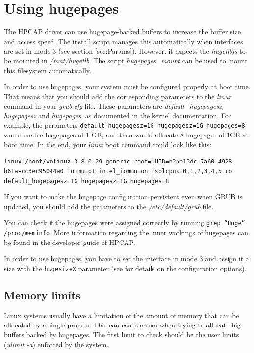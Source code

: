 \documentclass[a4paper,oneside]{hpman}
\begin{document}
\section{Using hugepages}
\label{sec:Hugepages}

The HPCAP driver can use hugepage-backed buffers to increase the buffer size and access speed. The install script manages this automatically when interfaces are set in mode 3 (see section \ref{sec:Params}). However, it expects the \textit{hugetlbfs} to be mounted in \textit{/mnt/hugetlb}. The script \textit{hugepages\_mount} can be used to mount this filesystem automatically.

In order to use hugepages, your system must be configured properly at boot time. That means that you should add the corresponding parameters to the \textit{linux} command in your \textit{grub.cfg} file. These parameters are \textit{default\_hugepagesz, hugepagesz} and \textit{hugepages}, as documented in the kernel documentation. For example, the parameters \texttt{default\_hugepagesz=1G hugepagesz=1G hugepages=8} would enable hugepages of 1 GB, and then would allocate 8 hugepages of 1GB at boot time. In the end, your \textit{linux} boot command could look like this:

\texttt{linux /boot/vmlinuz-3.8.0-29-generic root=UUID=b2be13dc-7a60-4928-b61a-cc3ec95044a0 iommu=pt intel\_iommu=on isolcpus=0,1,2,3,4,5 ro default\_hugepagesz=1G hugepagesz=1G hugepages=8}

If you want to make the hugepage configuration persistent even when GRUB is updated, you should add the parameters to the \textit{/etc/default/grub} file.

You can check if the hugepages were assigned correctly by running \texttt{grep ``Huge'' /proc/meminfo}. More information regarding the inner workings of hugepages can be found in the developer guide of HPCAP.

In order to use hugepages, you have to set the interface in mode 3 and assign it a size with the \texttt{hugesizeX} parameter (see  for details on the configuration options).

\subsection{Memory limits}
\label{sec:Hugepages:Memlimits}

Linux systems usually have a limitation of the amount of memory that can be allocated by a single process. This can cause errors when trying to allocate big buffers backed by hugepages. The first limit to check should be the user limits (\textit{ulimit -a}) enforced by the system.
\end{document}
